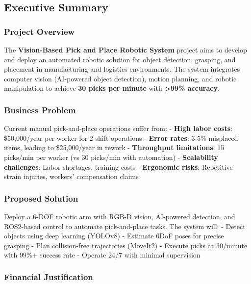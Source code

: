 \documentclass[
]{article}
\begin{document}
\hypertarget{executive-summary}{%
\subsection{Executive Summary}\label{executive-summary}}

\hypertarget{project-overview}{%
\subsubsection{Project Overview}\label{project-overview}}

The \textbf{Vision-Based Pick and Place Robotic System} project aims to
develop and deploy an automated robotic solution for object detection,
grasping, and placement in manufacturing and logistics environments. The
system integrates computer vision (AI-powered object detection), motion
planning, and robotic manipulation to achieve \textbf{30 picks per
minute} with \textbf{\textgreater99\% accuracy}.

\hypertarget{business-problem}{%
\subsubsection{Business Problem}\label{business-problem}}

Current manual pick-and-place operations suffer from: - \textbf{High
labor costs}: \$50,000/year per worker for 2-shift operations -
\textbf{Error rates}: 3-5\% misplaced items, leading to \$25,000/year in
rework - \textbf{Throughput limitations}: 15 picks/min per worker (vs 30
picks/min with automation) - \textbf{Scalability challenges}: Labor
shortages, training costs - \textbf{Ergonomic risks}: Repetitive strain
injuries, workers' compensation claims

\hypertarget{proposed-solution}{%
\subsubsection{Proposed Solution}\label{proposed-solution}}

Deploy a 6-DOF robotic arm with RGB-D vision, AI-powered detection, and
ROS2-based control to automate pick-and-place tasks. The system will: -
Detect objects using deep learning (YOLOv8) - Estimate 6DoF poses for
precise grasping - Plan collision-free trajectories (MoveIt2) - Execute
picks at 30/minute with 99\%+ success rate - Operate 24/7 with minimal
supervision

\hypertarget{financial-justification}{%
\subsubsection{Financial Justification}\label{financial-justification}}
\end{document}

